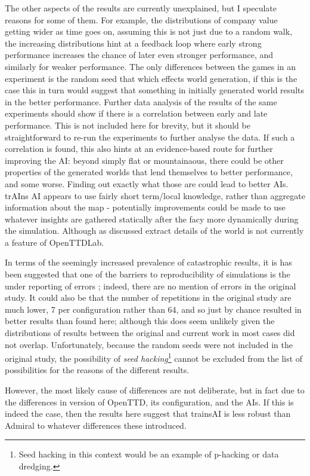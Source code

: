 \documentclass[logo,msc,dsti]{style/infthesis}    %
\newcommand{\singlespacedfootnote}[1]{{\singlespace\footnote{#1}}}
\begin{document}
{The other aspects of the results are currently unexplained, but I speculate reasons for some of them. For example, the distributions of company value getting wider as time goes on, assuming this is not just due to a random walk, the increasing distributions hint at a feedback loop where early strong performance increases the chance of later even stronger performance, and similarly for weaker performance. The only differences between the games in an experiment is the random seed that which effects world generation, if this is the case this in turn would suggest that something in initially generated world results in the better performance. Further data analysis of the results of the same experiments should show if there is a correlation between early and late performance. This is not included here for brevity, but it should be straightforward to re-run the experiments to further analyse the data. If such a correlation is found, this also hints at an evidence-based route for further improving the AI: beyond simply flat or mountainaous, there could be other properties of the generated worlds that lend themselves to better performance, and some worse. Finding out exactly what those are could lead to better AIs. trAIns AI appears to use fairly short term/local knowledge, rather than aggregate information about the map - potentially improvements could be made to use whatever insights are gathered statically after the facy more dynamically during the simulation. Although as discussed extract details of the world is not currently a feature of OpenTTDLab.

In terms of the seemingly increased prevalence of catastrophic results, it is has been suggested that one of the barriers to reproducibility of simulations is the under reporting of errors \cite{luijken2024replicability}; indeed, there are no mention of errors in the original study. It could also be that the number of repetitions in the original study are much lower, 7 per configuration rather than 64, and so just by chance resulted in better results than found here; although this does seem unlikely given the distributions of results between the original and current work in most cases did not overlap. Unfortunately, because the random seeds were not included in the original study, the possibility of \emph{seed hacking}\singlespacedfootnote{Seed hacking in this context would be an example of p-hacking or data dredging.} cannot be excluded from the list of possibilities for the reasons of the different results.

However, the most likely cause of differences are not deliberate, but in fact due to the differences in version of OpenTTD, its configuration, and the AIs. If this is indeed the case, then the results here suggest that trainsAI is less robust than Admiral to whatever differences these introduced.

}
\end{document}

